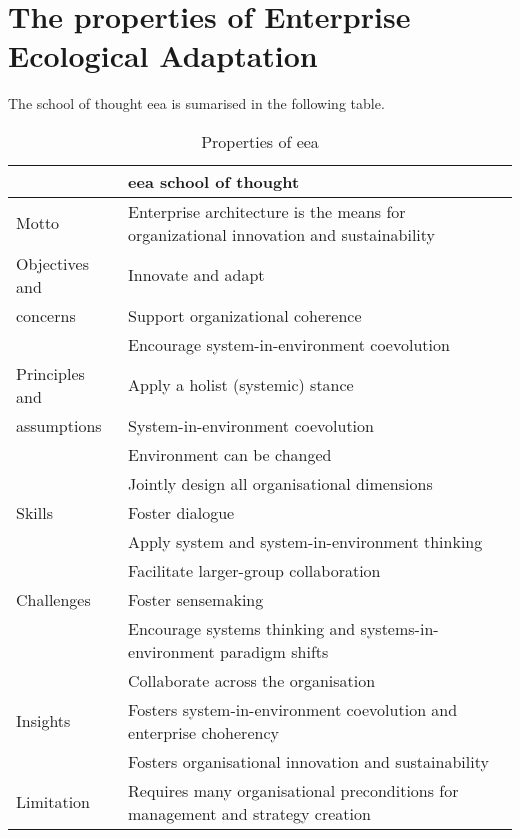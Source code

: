 \section{The properties of Enterprise Ecological Adaptation}
\label{appsec:eea}
The school of thought \acrlong{eea} is sumarised in the following table.
\begin{small}
\begin{longtable}{p{}p{}}
	\toprule
	& \textbf{\acrlong{eea} school of thought} \\ \midrule%
	\endhead%
	\hline
	\caption{Properties of \acrlong{eea} \parencite[p. 39]{Lapalme2012}}
	\label{tab:eaeea}	
	\endfoot%
	Motto    		& Enterprise architecture is the means for organizational innovation and sustainability \\
	Objectives and 	& Innovate and adapt    \\
	concerns		& Support organizational coherence \\
					& Encourage system-in-environment coevolution \\
	Principles and  & Apply a holist (systemic) stance \\
	assumptions		& System-in-environment coevolution  \\
					& Environment can be changed \\
					& Jointly design all organisational dimensions \\
	Skills 			& Foster dialogue \\
					& Apply system and system-in-environment thinking \\
					& Facilitate larger-group collaboration \\
	Challenges		& Foster sensemaking \\
					& Encourage systems thinking and systems-in-environment paradigm shifts \\
					& Collaborate across the organisation \\
	Insights		& Fosters system-in-environment coevolution and enterprise choherency \\
					& Fosters organisational innovation and sustainability \\
	Limitation		& Requires many organisational preconditions for management and strategy creation \\
	\bottomrule
\end{longtable}
\end{small}